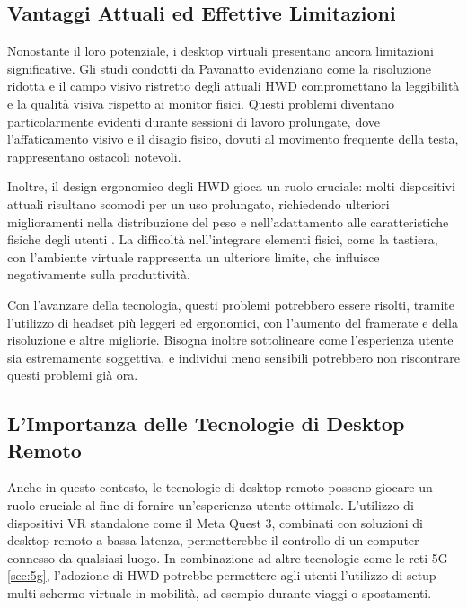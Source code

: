 \documentclass[12pt,a4paper,openright,twoside]{book}
\begin{document}
\subsection{Vantaggi Attuali ed Effettive Limitazioni}

Nonostante il loro potenziale, i desktop virtuali presentano ancora limitazioni significative. Gli studi condotti da Pavanatto \cite{pavanatto2021, frontiers2023} evidenziano come la risoluzione ridotta e il campo visivo ristretto degli attuali HWD compromettano la leggibilità e la qualità visiva rispetto ai monitor fisici. Questi problemi diventano particolarmente evidenti durante sessioni di lavoro prolungate, dove l'affaticamento visivo e il disagio fisico, dovuti al movimento frequente della testa, rappresentano ostacoli notevoli.

Inoltre, il design ergonomico degli HWD gioca un ruolo cruciale: molti dispositivi attuali risultano scomodi per un uso prolungato, richiedendo ulteriori miglioramenti nella distribuzione del peso e nell'adattamento alle caratteristiche fisiche degli utenti \cite{frontiers2023}. La difficoltà nell'integrare elementi fisici, come la tastiera, con l'ambiente virtuale rappresenta un ulteriore limite, che influisce negativamente sulla produttività.

Con l'avanzare della tecnologia, questi problemi potrebbero essere risolti, tramite l'utilizzo di headset più leggeri ed ergonomici, con l'aumento del framerate e della risoluzione e altre migliorie. Bisogna inoltre sottolineare come l'esperienza utente sia estremamente soggettiva, e individui meno sensibili potrebbero non riscontrare questi problemi già ora.

\subsection{L'Importanza delle Tecnologie di Desktop Remoto}

Anche in questo contesto, le tecnologie di desktop remoto possono giocare un ruolo cruciale al fine di fornire un'esperienza utente ottimale. L'utilizzo di dispositivi VR standalone come il Meta Quest 3, combinati con soluzioni di desktop remoto a bassa latenza, permetterebbe il controllo di un computer connesso da qualsiasi luogo. In combinazione ad altre tecnologie come le reti 5G \ref{sec:5g}, l'adozione di HWD potrebbe permettere agli utenti l'utilizzo di setup multi-schermo virtuale in mobilità, ad esempio durante viaggi o spostamenti.

\end{document}

